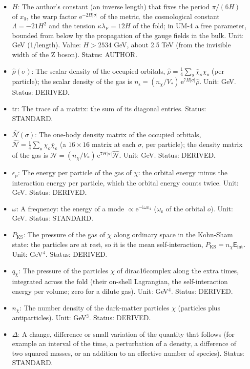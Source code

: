 \documentclass[
  10pt,
]{article}
\begin{document}
\begin{itemize}
  \(\mathrm{e}^{X}\) is the exponential of \(X\). Unit: dimensionless.
  Value: 2.718281828. Status: STANDARD.
\item
  \(H\): The author's constant (an inverse length) that fixes the period
  \(\pi/(6H)\) of \(x_0\), the warp factor
  \(\mathrm{e}^{-2H\lvert\sigma\rvert}\) of the metric, the cosmological
  constant \(\Lambda = -21H^2\) and the tension
  \(\kappa\lambda_{\mathrm{F}} = 12H\) of the fold; in UM-4 a free
  parameter, bounded from below by the propagation of the gauge fields
  in the bulk. Unit: GeV (1/length). Value: \(H > 2534\) GeV, about 2.5
  TeV (from the invisible width of the Z boson). Status: AUTHOR.
\item
  \(\hat\rho(\sigma)\): The scalar density of the occupied orbitals,
  \(\hat\rho = \frac14\sum_o\bar\chi_o\chi_o\) (per particle); the
  scalar density of the gas is
  \(n_{\mathrm{s}} = (n_\chi/V_*)\,\mathrm{e}^{7H\lvert\sigma\rvert}\hat\rho\).
  Unit: GeV. Status: DERIVED.
\item
  \(\mathrm{tr}\): The trace of a matrix: the sum of its diagonal
  entries. Status: STANDARD.
\item
  \(\hat{\mathcal{N}}(\sigma)\): The one-body density matrix of the
  occupied orbitals,
  \(\hat{\mathcal{N}} = \frac14\sum_o\chi_o\bar\chi_o\) (a
  \(16 \times 16\) matrix at each \(\sigma\), per particle); the density
  matrix of the gas is
  \(\mathcal{N} = (n_\chi/V_*)\,\mathrm{e}^{7H\lvert\sigma\rvert}\hat{\mathcal{N}}\).
  Unit: GeV. Status: DERIVED.
\item
  \(\epsilon_{\mathrm{p}}\): The energy per particle of the gas of
  \(\chi\): the orbital energy minus the interaction energy per
  particle, which the orbital energy counts twice. Unit: GeV. Status:
  DERIVED.
\item
  \(\omega\): A frequency: the energy of a mode
  \(\propto \mathrm{e}^{-\mathrm{i}\omega x_4}\) (\(\omega_o\) of the
  orbital \(o\)). Unit: GeV. Status: STANDARD.
\item
  \(P_{\mathrm{KS}}\): The pressure of the gas of \(\chi\) along
  ordinary space in the Kohn-Sham state: the particles are at rest, so
  it is the mean self-interaction,
  \(P_{\mathrm{KS}} = n_\chi\mathsf{E}_{\mathrm{int}}\). Unit:
  GeV\(^4\). Status: DERIVED.
\item
  \(q_\chi\): The pressure of the particles \(\chi\) of dirac16complex
  along the extra times, integrated across the fold (their on-shell
  Lagrangian, the self-interaction energy per volume; zero for a dilute
  gas). Unit: GeV\(^4\). Status: DERIVED.
\item
  \(n_\chi\): The number density of the dark-matter particles \(\chi\)
  (particles plus antiparticles). Unit: GeV\(^3\). Status: DERIVED.
\item
  \(\Delta\): A change, difference or small variation of the quantity
  that follows (for example an interval of the time, a perturbation of a
  density, a difference of two squared masses, or an addition to an
  effective number of species). Status: STANDARD.
\end{itemize}
\end{document}
